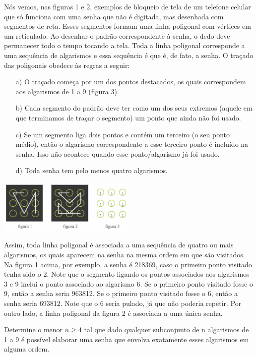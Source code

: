 Nós vemos, nas figuras 1 e 2, exemplos de bloqueio de tela de um telefone celular que só funciona com uma senha que não é digitada, mas desenhada com segmentos de reta. Esses segmentos formam uma linha poligonal com vértices em um reticulado. Ao desenhar o padrão correspondente à senha, o dedo deve permanecer todo o tempo tocando a tela. Toda a linha poligonal corresponde a uma sequência de algarismos e essa sequência é que é, de fato, a senha. O traçado das poligonais obedece às regras a seguir:

\begin{itemize}

\item[a)] O traçado começa por um dos pontos destacados, os quais correspondem aos algarismos de 1 a 9 (figura 3).

\item[b)] Cada segmento do padrão deve ter como um dos seus extremos (aquele em que terminamos de traçar o segmento) um ponto que ainda
não foi usado.

\item[c)] Se um segmento liga dois pontos e contém um terceiro (o seu ponto médio), então o algarismo correspondente a esse terceiro ponto é incluído na senha. Isso não acontece quando esse ponto/algarismo já foi usado.

\item[d)] Toda senha tem pelo menos quatro algarismos.

\end{itemize}

\begin{center}
    \includegraphics[width = 0.5\textwidth]{figura.png}
\end{center}


Assim, toda linha poligonal é associada a uma sequência de quatro ou mais algarismos, os quais aparecem na senha na mesma ordem em que são visitados. Na figura 1 acima, por exemplo, a senha é 218369, caso o
primeiro ponto visitado tenha sido o 2. Note que o segmento ligando os pontos associados aos algarismos 3 e 9 inclui o ponto associado ao algarismo 6. Se o primeiro ponto visitado fosse o 9, então a senha seria 963812. Se o primeiro ponto visitado fosse o 6, então a senha seria 693812. Note que o 6 seria pulado, já que não poderia repetir. Por outro lado, a linha poligonal da figura 2 é associada a uma única senha.

Determine o menor $n \ge 4 $ tal que dado qualquer subconjunto de n algarismos de 1 a 9 é possível elaborar uma senha que envolva exatamente esses algarismos em alguma ordem.